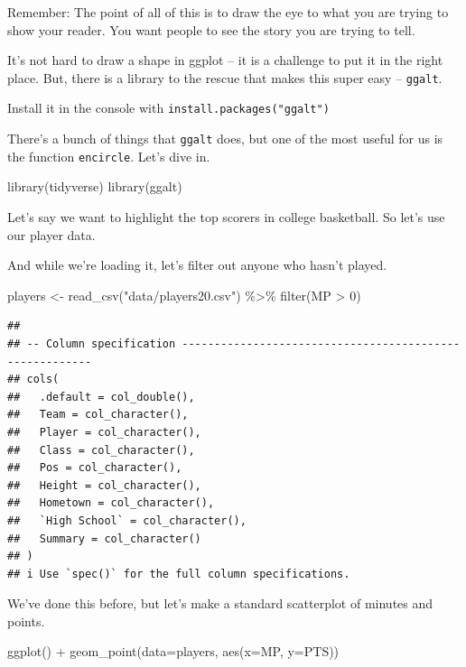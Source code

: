 \documentclass[
]{book}
\newenvironment{Shaded}{\begin{snugshade}}{\end{snugshade}}
\newcommand{\AttributeTok}[1]{\textcolor[rgb]{0.77,0.63,0.00}{#1}}
\newcommand{\DecValTok}[1]{\textcolor[rgb]{0.00,0.00,0.81}{#1}}
\newcommand{\FunctionTok}[1]{\textcolor[rgb]{0.00,0.00,0.00}{#1}}
\newcommand{\NormalTok}[1]{#1}
\newcommand{\OtherTok}[1]{\textcolor[rgb]{0.56,0.35,0.01}{#1}}
\newcommand{\SpecialCharTok}[1]{\textcolor[rgb]{0.00,0.00,0.00}{#1}}
\newcommand{\StringTok}[1]{\textcolor[rgb]{0.31,0.60,0.02}{#1}}
\begin{document}
Remember: The point of all of this is to draw the eye to what you are trying to show your reader. You want people to see the story you are trying to tell.

It's not hard to draw a shape in ggplot -- it is a challenge to put it in the right place. But, there is a library to the rescue that makes this super easy -- \texttt{ggalt}.

Install it in the console with \texttt{install.packages("ggalt")}

There's a bunch of things that \texttt{ggalt} does, but one of the most useful for us is the function \texttt{encircle}. Let's dive in.

\begin{Shaded}
\begin{Highlighting}[]
\FunctionTok{library}\NormalTok{(tidyverse)}
\FunctionTok{library}\NormalTok{(ggalt)}
\end{Highlighting}
\end{Shaded}

Let's say we want to highlight the top scorers in college basketball. So let's use our player data.

And while we're loading it, let's filter out anyone who hasn't played.

\begin{Shaded}
\begin{Highlighting}[]
\NormalTok{players }\OtherTok{\textless{}{-}} \FunctionTok{read\_csv}\NormalTok{(}\StringTok{"data/players20.csv"}\NormalTok{) }\SpecialCharTok{\%\textgreater{}\%} \FunctionTok{filter}\NormalTok{(MP }\SpecialCharTok{\textgreater{}} \DecValTok{0}\NormalTok{)}
\end{Highlighting}
\end{Shaded}

\begin{verbatim}
## 
## -- Column specification --------------------------------------------------------
## cols(
##   .default = col_double(),
##   Team = col_character(),
##   Player = col_character(),
##   Class = col_character(),
##   Pos = col_character(),
##   Height = col_character(),
##   Hometown = col_character(),
##   `High School` = col_character(),
##   Summary = col_character()
## )
## i Use `spec()` for the full column specifications.
\end{verbatim}

We've done this before, but let's make a standard scatterplot of minutes and points.

\begin{Shaded}
\begin{Highlighting}[]
\FunctionTok{ggplot}\NormalTok{() }\SpecialCharTok{+} \FunctionTok{geom\_point}\NormalTok{(}\AttributeTok{data=}\NormalTok{players, }\FunctionTok{aes}\NormalTok{(}\AttributeTok{x=}\NormalTok{MP, }\AttributeTok{y=}\NormalTok{PTS))}
\end{Highlighting}
\end{Shaded}
\end{document}
